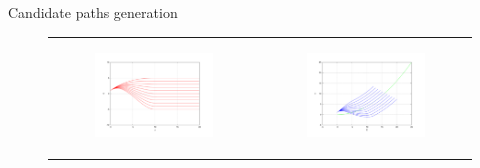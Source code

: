 \begin{frame}{Candidate paths generation}
  \begin{figure}
  \centering
  \begin{tabular}{cc}
    \begin{subfigure}[b]{0.3\textwidth}
      \centering
      \includegraphics[height=0.3\textheight, trim=50 40 80 60,clip]{frenet45}
    \end{subfigure} &
    \begin{subfigure}[b]{0.3\textwidth}
      \centering
      \includegraphics[height=0.3\textheight, trim=50 40 80 60,clip]{cartesian45}
      \end{subfigure}
  \end{tabular}
  \end{figure}
  \note {
    
  }
\end{frame}

